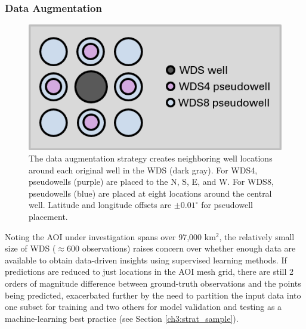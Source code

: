 \subsubsection{Data Augmentation}\label{ch3:augmentation}

\begin{figure}
\centering
\includegraphics[scale=0.9]{templates/images/Figure-AugmentedWells.png}
\singlespacing
\caption[Data augmentation strategy]{The data augmentation strategy creates neighboring well locations around each original well in the WDS (dark gray). For WDS4, pseudowells (purple) are placed to the N, S, E, and W. For WDS8, pseudowells (blue) are placed at eight locations around the central well. Latitude and longitude offsets are $\pm0.01^\circ$ for pseudowell placement.}
\label{fig:data_augmentation}
\end{figure}

Noting the AOI under investigation spans over 97,000 km$^2$, the relatively small size of WDS ($\approx600$ observations) raises concern over whether enough data are available to obtain data-driven insights using supervised learning methods. If predictions are reduced to just locations in the AOI mesh grid, there are still 2 orders of magnitude difference between ground-truth observations and the points being predicted, exacerbated further by the need to partition the input data into one subset for training and two others for model validation and testing as a machine-learning best practice \citep[e.g.,][p.\ 222]{hastie_elements_2009} (see Section \ref{ch3:strat_sample}). 


